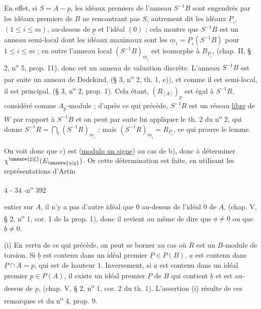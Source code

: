 En effet, si $S=A-\underline{p}$, les idéaux premiers de l'anneau $S^{-1}B$ sont engendrés par les idéaux premiers de $B$ ne rencontrant pas $S$, autrement dit les idéaux $\underline{P}_i$, $(1\le i\le m)$, au-dessus de $\underline{p}$ et l'idéal $(0)$ ; cela montre que $S^{-1}B$ est un anneau semi-local dont les idéaux maximaux sont les $\underline{m}_i=\underline{P}_i(S^{-1}B)$ pour $1\le i\le m$ ; en outre l'anneau local $(S^{-1}B)_{\underline{m}_i}$ est isomorphe à $B_{\underline{P}_i}$, (chap. II, § 2, n\textsuperscript{o} 5, prop. 11), donc est un anneau de valuation discrète. L'anneau $S^{-1}B$ est par suite un anneau de Dedekind, (§ 3, n\textsuperscript{o} 2, th. 1, e)), et comme il est semi-local, il est principal, (§ 3, n\textsuperscript{o} 2, prop. 1). Cela étant, $(R_{[A]})_{\underline{p}}$ est égal à $S^{-1}R$, considéré comme $A_{\underline{p}}$-module ; d'après ce qui précède, $S^{-1}R$ est un réseau \uline{libre} de $W$ par rapport à $S^{-1}B$ et on peut par suite lui appliquer le th. 2 du n\textsuperscript{o} 2, qui donne $S^{-1}R=\bigcap_i(S^{-1}R)_{\underline{m}_i}$ ; mais $(S^{-1}R)_{\underline{m}_i}=R_{\underline{P}_i}$, ce qui prouve le lemme.

On voit donc que c) est  (\uline{modulo un signe}) au cas de b), donc à déterminer $\chi^{\unsure{\natural|\xi}}(E_{\unsure{\eta|y}})$. Or cette détermination est faite, en utilisant les représentations d'Artin 

\begin{center}4 - 34 -\hfill n\textsuperscript{o} 392\end{center}

entier sur $A$, il n'y a pas d'autre idéal que $0$ au-dessus de l'idéal $0$ de $A$, (chap. V, § 2, n\textsuperscript{o} 1, cor. 1 de la prop. 1), donc il revient au même de dire que $\underline{a}\ne0$ ou que $\underline{b}\ne0$.

(i) En vertu de ce qui précède, on peut se borner au cas où $R$ est un $B$-module de torsion. Si $\underline{b}$ est contenu dans un idéal premier $\underline{P}\in P(B)$, $\underline{a}$ est contenu dans $\underline{P}\cap A=\underline{p}$, qui est de hauteur $1$. Inversement, si $\underline{a}$ est contenu dans un idéal premier $\underline{p}\in P(A)$, il existe un idéal premier $\underline{P}$ de $B$ qui contient $\underline{b}$ et est au-dessus de $\underline{p}$, (chap. V, § 2, n\textsuperscript{o} 1, cor. 2 du th. 1). L'assertion (i) résulte de ces remarques et du n\textsuperscript{o} 4, prop. 9.

